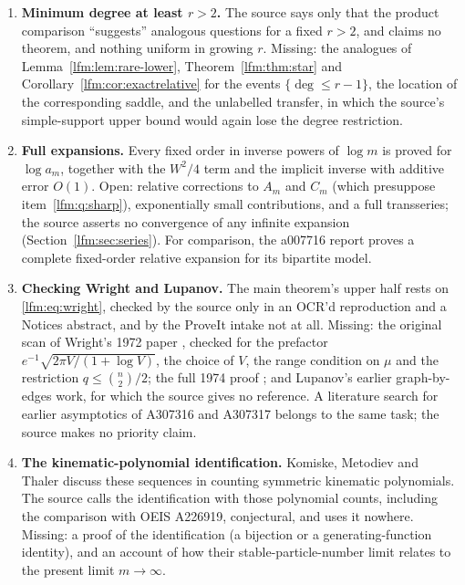 \documentclass[11pt,letterpaper]{article}
\theoremstyle{remark}\newtheorem{remark}[theorem]{Remark}
\begin{document}
\begin{enumerate}
\item\label{lfm:q:degree} \textbf{Minimum degree at least $r>2$.} The source
says only that the product comparison ``suggests'' analogous questions for
a fixed $r>2$, and claims no theorem, and nothing uniform in growing $r$.
Missing: the analogues of Lemma~\ref{lfm:lem:rare-lower},
Theorem~\ref{lfm:thm:star} and Corollary~\ref{lfm:cor:exactrelative} for the
events $\{\deg\le r-1\}$, the location of the corresponding saddle, and the
unlabelled transfer, in which the source's simple-support upper bound would
again lose the degree restriction.

\item\label{lfm:q:expansions} \textbf{Full expansions.} Every fixed order in
inverse powers of $\log m$ is proved for $\log a_m$, together with the
$W^2/4$ term and the implicit inverse with additive error $O(1)$. Open:
relative corrections to $A_m$ and $C_m$ (which presuppose
item~\ref{lfm:q:sharp}), exponentially small contributions, and a full
transseries; the source asserts no convergence of any infinite expansion
(Section~\ref{lfm:sec:series}). For comparison, the a007716 report proves a
complete fixed-order relative expansion for its bipartite model.

\item\label{lfm:q:wright} \textbf{Checking Wright and Lupanov.} The main
theorem's upper half rests on \eqref{lfm:eq:wright}, checked by the source
only in an OCR'd reproduction and a Notices abstract, and by the ProveIt
intake not at all. Missing: the original scan of Wright's 1972 paper
\cite{wright72}, checked for the prefactor
$e^{-1}\sqrt{2\pi V/(1+\log V)}$, the choice of $V$, the range condition on
$\mu$ and the restriction $q\le\binom n2/2$; the full 1974 proof
\cite{wright74}; and Lupanov's earlier graph-by-edges work, for which the
source gives no reference. A literature search for earlier asymptotics of
A307316 and A307317 belongs to the same task; the source makes no priority
claim.

\item\label{lfm:q:kinematic} \textbf{The kinematic-polynomial
identification.} Komiske, Metodiev and Thaler \cite{komiske} discuss these
sequences in counting symmetric kinematic polynomials. The source calls the
identification with those polynomial counts, including the comparison with
OEIS A226919, conjectural, and uses it nowhere. Missing: a proof of the
identification (a bijection or a generating-function identity), and an
account of how their stable-particle-number limit relates to the present
limit $m\to\infty$.
\end{enumerate}
\end{document}
